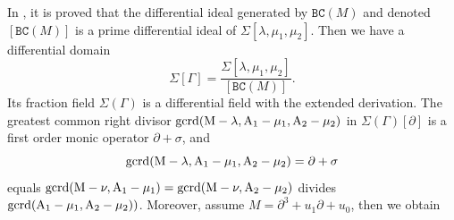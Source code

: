 \documentclass[a4paper,12pt]{article}
\def\gcrd{\rm gcrd}
\def\BC{\texttt{BC}}
\begin{document}
In  \cite{RZ2024}, it is proved that the differential ideal generated by $\BC (M)$ and denoted $[\BC(M)]$ is a prime differential ideal of $\Sigma [\lambda,\mu_1,\mu_2]$. Then we have a differential domain
\begin{equation*}\label{eq-anillocurva}
{\Sigma[\Gamma]=\frac{\Sigma [\lambda,\mu_1,\mu_2]}{[\BC(M)]}}.
\end{equation*}
Its fraction field 
{$\Sigma(\Gamma)$} is a differential field with the extended derivation.  {The greatest common right divisor $\gcrd(M-\lambda,A_1-\mu_1,A_2-\mu_2)$ in $\Sigma(\Gamma)[\partial]$} is a first order monic operator $\partial+\sigma$, and
\begin{equation}\label{eq-globalFac} 
 \gcrd(M-\lambda,A_1-\mu_1,A_2-\mu_2) = \partial+\sigma
\end{equation}
equals
${\gcrd(M-\nu,A_1-\mu_1)=\gcrd(M-\nu,A_2-\mu_2)}$ 
 divides $\gcrd(A_1-\mu_1, A_2-\mu_2))$. Moreover, assume $M=\partial^3+u_1\partial+u_0$, then we obtain
\end{document}
